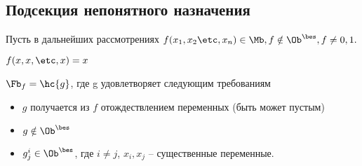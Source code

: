 \documentclass[unicode,10pt]{article}
\begin{document}
\subsection{Подсекция непонятного назначения}
\begin{note}
  Пусть в дальнейших рассмотрениях
  \begin{math}
    f(\set[x]{n}) \in \Mb, f \notin \Oib, f \neq 0,1.
  \end{math}
\end{note}
\begin{stm}
  \begin{math}
    f (x,x,\etc,x) =x
  \end{math}
\end{stm}
\begin{df}
  $\Ff = \hc{g}$, где g удовлетворяет следующим требованиям
    \begin{itemize}
      \item $g$ получается из $f$ отождествлением переменных (быть может пустым)
      \item $ g \notin \Oib$
      \item $g^i_j \in \Oib$, где $i\ne j$, $x_i,x_j$ -- существенные переменные.
    \end{itemize}
\end{df}
\end{document}
